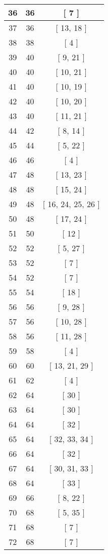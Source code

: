 \begin{center}
\begin{longtable}[H]{|| c c c ||}
36 & 36 & [ 7 ] \\ 
\hline
37 & 36 & [ 13, 18 ] \\ 
\hline
38 & 38 & [ 4 ] \\ 
\hline
39 & 40 & [ 9, 21 ] \\ 
\hline
40 & 40 & [ 10, 21 ] \\ 
\hline
41 & 40 & [ 10, 19 ] \\ 
\hline
42 & 40 & [ 10, 20 ] \\ 
\hline
43 & 40 & [ 11, 21 ] \\ 
\hline
44 & 42 & [ 8, 14 ] \\ 
\hline
45 & 44 & [ 5, 22 ] \\ 
\hline
46 & 46 & [ 4 ] \\ 
\hline
47 & 48 & [ 13, 23 ] \\ 
\hline
48 & 48 & [ 15, 24 ] \\ 
\hline
49 & 48 & [ 16, 24, 25, 26 ] \\ 
\hline
50 & 48 & [ 17, 24 ] \\ 
\hline
51 & 50 & [ 12 ] \\ 
\hline
52 & 52 & [ 5, 27 ] \\ 
\hline
53 & 52 & [ 7 ] \\ 
\hline
54 & 52 & [ 7 ] \\ 
\hline
55 & 54 & [ 18 ] \\ 
\hline
56 & 56 & [ 9, 28 ] \\ 
\hline
57 & 56 & [ 10, 28 ] \\ 
\hline
58 & 56 & [ 11, 28 ] \\ 
\hline
59 & 58 & [ 4 ] \\ 
\hline
60 & 60 & [ 13, 21, 29 ] \\ 
\hline
61 & 62 & [ 4 ] \\ 
\hline
62 & 64 & [ 30 ] \\ 
\hline
63 & 64 & [ 30 ] \\ 
\hline
64 & 64 & [ 32 ] \\ 
\hline
65 & 64 & [ 32, 33, 34 ] \\ 
\hline
66 & 64 & [ 32 ] \\ 
\hline
67 & 64 & [ 30, 31, 33 ] \\ 
\hline
68 & 64 & [ 33 ] \\ 
\hline
69 & 66 & [ 8, 22 ] \\ 
\hline
70 & 68 & [ 5, 35 ] \\ 
\hline
71 & 68 & [ 7 ] \\ 
\hline
72 & 68 & [ 7 ] \\ 
\hline

\end{longtable}
\end{center}
